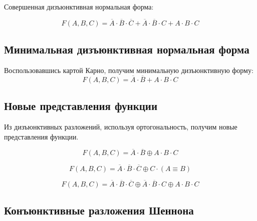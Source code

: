 \documentclass[a4paper,10pt]{article} %
\begin{document}
	Совершенная дизъюнктивная нормальная форма: 
	
	\begin{equation}
		F(A, B, C) = \overline{A} \cdot \overline{B} \cdot \overline{C} +
		\overline{A} \cdot \overline{B} \cdot C + 
		A \cdot B \cdot C 
	\end{equation}
	
	\subsection{Минимальная дизъюнктивная нормальная форма}
	
	Воспользовавшись картой Карно, получим минимальную дизъюнктивную форму:
	\begin{equation}
		F(A, B, C) = \overline{A} \cdot \overline{B} + A \cdot B \cdot C 
	\end{equation}

	\subsection{Новые представления функции}
	
	Из дизъюнктивных разложений, используя ортогональность, получим новые представления функции.
	
	\begin{equation}
		F(A, B, C) = \overline{A} \cdot \overline{B} \oplus A \cdot B \cdot C
	\end{equation}
	
	\begin{equation}
		F(A, B, C) = \overline{A} \cdot \overline{B} \cdot \overline{C} 
		\oplus C \cdot (A \equiv B) 
	\end{equation}
	
	\begin{equation}
		F(A, B, C) = \overline{A} \cdot \overline{B} \cdot \overline{C} \oplus
		\overline{A} \cdot \overline{B} \cdot C \oplus
		A \cdot B \cdot C 
	\end{equation}
	
	\subsection{Конъюнктивные разложения Шеннона}
	
\end{document}
